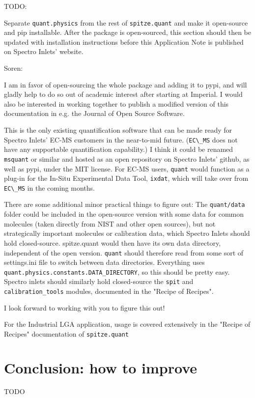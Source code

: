 \documentclass{article}
\newcommand{\code}[1]{\colorbox{codegray}{\lstinline{#1}}}
\begin{document}
{ \color{red} 	
TODO: 

Separate \code{quant.physics} from the rest of \code{spitze.quant} and make it open-source and pip installable. After the package is open-sourced, this section should then be updated with installation instructions before this Application Note is published on Spectro Inlets' website. 
	
Soren: 

I am in favor of open-sourcing the whole package and adding it to pypi, and will gladly help to do so out of academic interest after starting at Imperial. I would also be interested in working together to publish a modified version of this documentation in e.g. the Journal of Open Source Software.

This is the only existing quantification software that can be made ready for Spectro Inlets' EC-MS customers in the near-to-mid future. (\code{EC\_MS} does not have any supportable quantification capability.) I think it could be renamed \texttt{msquant} or similar and hosted as an open repository on Spectro Inlets' github, as well as pypi, under the MIT license. For EC-MS users, \code{quant} would function as a plug-in for the In-Situ Experimental Data Tool, \code{ixdat}, which will take over from \code{EC\_MS} in the coming months.

There are some additional minor practical things to figure out: The \texttt{quant/data} folder could be included in the open-source version with some data for common molecules (taken directly from NIST and other open sources), but not strategically important molecules or calibration data, which Spectro Inlets should hold closed-source. spitze.quant would then have its own data directory, independent of the open version. \texttt{quant} should therefore read from some sort of settings.ini file to switch between data directories. Everything uses \\\texttt{quant.physics.constants.DATA\_DIRECTORY}, so this should be pretty easy. Spectro inlets should similarly hold closed-source the \texttt{spit} and \texttt{calibration\_tools} modules, documented in the "Recipe of Recipes".

I look forward to working with you to figure this out!
}
{
\color{blue}
For the Industrial LGA application, usage is covered extensively in the "Recipe of Recipes" documentation of \code{spitze.quant}
}

\section{Conclusion: how to improve}\label{sec:conclusion}

{\color{red} TODO}
\end{document}
